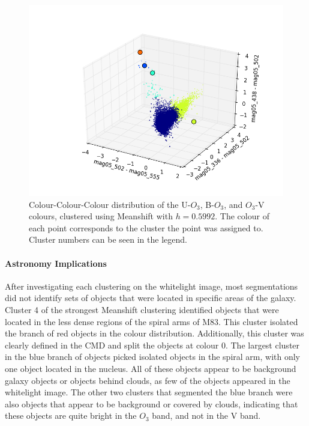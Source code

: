 \begin{figure}
\centering
\includegraphics[width=\linewidth]{figs/meanshift_3d_color_5cl_mag05_502-mag05_555vsmag05_336-mag05_502vsmag05_438-mag05_502}
\caption{Colour-Colour-Colour distribution of the U-$O_{3}$, B-$O_{3}$, and $O_{3}$-V colours, clustered using Meanshift with $h=0.5992$. The colour of each point corresponds to the cluster the point was assigned to. Cluster numbers can be seen in the legend.}
\label{fig:fig:OIIIVMS3d}
\end{figure}

\paragraph{Astronomy Implications}
After investigating each clustering on the whitelight image, most segmentations did not identify sets of objects that were located in specific areas of the galaxy.
Cluster 4 of the strongest Meanshift clustering identified objects that were located in the less dense regions of the spiral arms of M83.
This cluster isolated the branch of red objects in the colour distribution. Additionally, this cluster was clearly defined in the CMD and split the objects at colour 0.
The largest cluster in the blue branch of objects picked isolated objects in the spiral arm, with only one object located in the nucleus.
All of these objects appear to be background galaxy objects or objects behind clouds, as few of the objects appeared in the whitelight image.
The other two clusters that segmented the blue branch were also objects that appear to be background or covered by clouds, indicating that these objects are quite bright in the $O_{3}$ band, and not in the V band.




